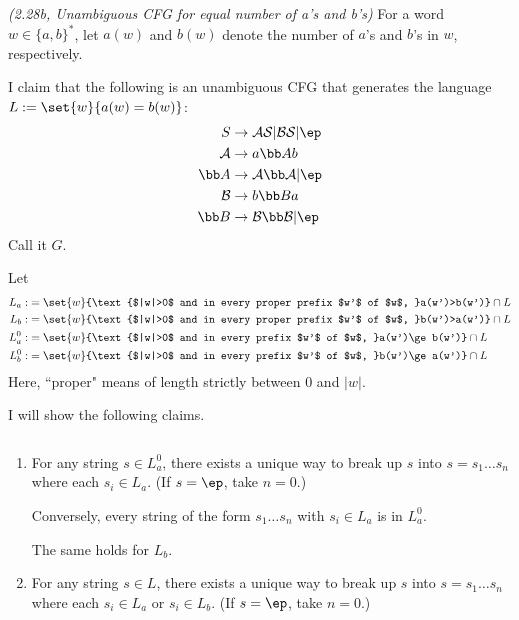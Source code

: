 \pagebreak

\begin{problem}{\it (2.28b, Unambiguous CFG for equal number of a's and b's)}
For a word $w\in \{a,b\}^*$, let $a(w)$ and $b(w)$ denote the number of $a$'s and $b$'s in $w$, respectively.

I claim that the following is an unambiguous CFG that generates the language $L:=\set{w}{a(w)=b(w)}$:
\begin{align*}
S&\to \cal A S|\cal BS|\ep\\
\cal A&\to a\bb A b\\
\bb A&\to \cal A \bb A|\ep\\
\cal B&\to b\bb B a\\
\bb B&\to \cal B \bb B|\ep
\end{align*}
Call it $G$. %

Let
\begin{align*}
L_a:&=\set{w}{\text{$|w|>0$ and in every proper prefix $w'$ of $w$, }a(w')>b(w')}\cap L\\
L_b:&=\set{w}{\text{$|w|>0$ and in every proper prefix $w'$ of $w$, }b(w')>a(w')}\cap L\\
L_a^0:&=\set{w}{\text{$|w|>0$ and in every prefix $w'$ of $w$, }a(w')\ge b(w')}\cap L\\
L_b^0:&=\set{w}{\text{$|w|>0$ and in every prefix $w'$ of $w$, }b(w')\ge a(w')}\cap L
\end{align*}
Here, ``proper" means of length strictly between 0 and $|w|$.

I will show the following claims.
\begin{clm} $\,$
\begin{enumerate}
\item
For any string $s\in L_a^0$, there exists a unique way to break up $s$ into $s=s_1\ldots s_n$ where each $s_i\in L_a$. (If $s=\ep$, take $n=0$.)

Conversely, every string of the form $s_1\ldots s_n$ with $s_i\in L_a$ is in $L_a^0$.

The same holds for $L_b$.
\item
For any string $s\in L$, there exists a unique way to break up $s$ into $s=s_1\ldots s_n$ where each 
$s_i\in L_a$ or $s_i\in L_b$. (If $s=\ep$, take $n=0$.)


\end{enumerate}
\end{clm}
\end{problem}
